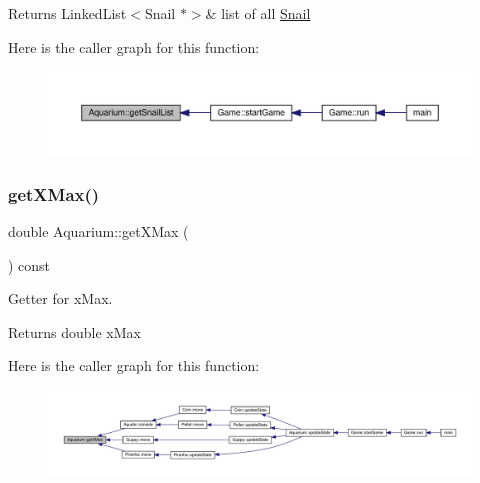 \begin{DoxyReturn}{Returns}
Linked\+List$<$\+Snail $\ast$$>$\& list of all \mbox{\hyperlink{class_snail}{Snail}} 
\end{DoxyReturn}
Here is the caller graph for this function\+:\nopagebreak
\begin{figure}[H]
\begin{center}
\leavevmode
\includegraphics[width=350pt]{class_aquarium_a278a38d4cf238908c4e3e170ea66841f_icgraph}
\end{center}
\end{figure}
\mbox{\label{class_aquarium_af0b5f88a7aaf71e817f809d7bee3e51e}} 
\subsubsection{\texorpdfstring{get\+X\+Max()}{getXMax()}}
{\footnotesize\ttfamily double Aquarium\+::get\+X\+Max (\begin{DoxyParamCaption}{ }\end{DoxyParamCaption}) const}



Getter for x\+Max. 

\begin{DoxyReturn}{Returns}
double x\+Max 
\end{DoxyReturn}
Here is the caller graph for this function\+:\nopagebreak
\begin{figure}[H]
\begin{center}
\leavevmode
\includegraphics[width=350pt]{class_aquarium_af0b5f88a7aaf71e817f809d7bee3e51e_icgraph}
\end{center}
\end{figure}
\mbox{\label{class_aquarium_a3e9e4b1bc86a90a8654bcc76e20e25f1}} 
